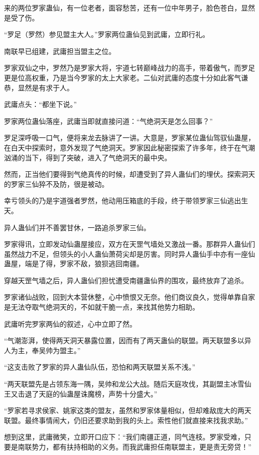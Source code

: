 \begin{this_body}
来的两位罗家蛊仙，有一位老者，面容愁苦，还有一位中年男子，脸色苍白，显然是受了伤。

“罗足（罗然）参见盟主大人。”罗家两位蛊仙见到武庸，立即行礼。

南联早已组建，武庸担当盟主之位。

罗家双仙之中，罗然乃是罗家大将，宇道七转巅峰战力的高手，带着傲气，而罗足更是位高权重，乃是当今罗家的太上大家老。二仙对武庸的态度十分如此客气谦恭，显然是有求于人。

武庸点头：“都坐下说。”

罗家两位蛊仙落座，武庸当即就直接问道：“气绝洞天是怎么回事？”

罗足深呼吸一口气，便将来龙去脉讲了一讲。大意是，罗家某位蛊仙驾驭仙蛊屋，在白天中探索时，意外发现了气绝洞天。罗家因此秘密探索了许多年，终于在气潮汹涌的当下，得到了突破，进入了气绝洞天的最中央。

然而，正当他们要得到气绝真传的时候，却遭受到了异人蛊仙们的埋伏。探索洞天的罗家三仙猝不及防，很是被动。

幸亏领头的乃是宇道强者罗然，他动用压箱底的手段，终于带领罗家三仙逃出生天。

异人蛊仙们并不善罢甘休，一路追杀罗家三仙。

罗家得讯，立即发动仙蛊屋接应，双方在天罡气墙处又激战一番。那群异人蛊仙们虽然战力不足，但领头的小人蛊仙萧荷尖却是厉害。同时异人蛊仙手中亦有一座仙蛊屋，端是了得，罗家不敌，狼狈逃回南疆。

穿越天罡气墙之后，异人蛊仙们担忧遭受南疆蛊仙界的围攻，最终放弃了追杀。

罗家诸仙战败，回到大本营休整，心中愤恨又无奈。他们商议良久，觉得单靠自家是无法夺取气绝洞天的，不如就干脆一点，来找其他势力相助。

武庸听完罗家两仙的叙述，心中立即了然。

“气潮澎湃，使得两天洞天暴露位置，因而有了两天蛊仙的联盟。两天联盟多以异人为主，奉吴帅为盟主。”

“这支击败了罗家的异人蛊仙队伍，恐怕和两天联盟关系不浅。”

“两天联盟先是占领东海一隅，吴帅和龙公大战。随后天庭攻伐，其副盟主冰雪仙王又击退了天庭的仙蛊屋诛魔榜，声势十分盛大。”

“罗家若寻求侯家、姚家这类的盟友，虽然和罗家体量相似，但却难敌庞大的两天联盟。最终事情闹大，仍旧还要求助到我的头上。索性他们就直接来找我求助。”

想到这里，武庸微笑，立即开口应下：“我们南疆正道，同气连枝。罗家受难，只要是南联势力，都有扶持相助的义务。而我武庸担任南联盟主，更是责无旁贷！”


\end{this_body}
